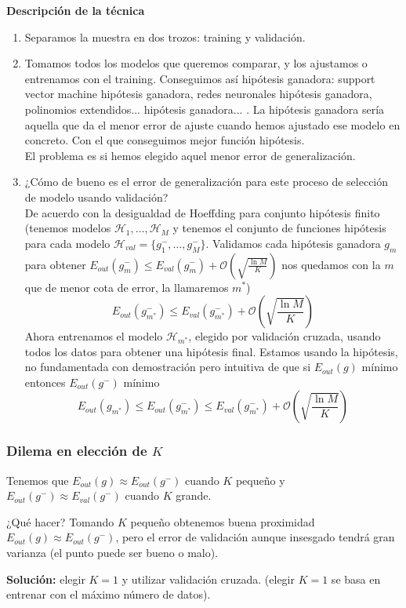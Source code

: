 \documentclass[11pt,a4paper]{article}
\theoremstyle{definition}
\begin{document}
	\textbf{Descripción de la técnica}
	\begin{enumerate}
		\item Separamos la muestra en dos trozos: training y validación.
		\item Tomamos todos los modelos que queremos comparar, y los ajustamos o entrenamos con el training. Conseguimos así hipótesis ganadora: support vector machine hipótesis ganadora, redes neuronales hipótesis ganadora, polinomios extendidos... hipótesis ganadora... . La hipótesis ganadora sería aquella que da el menor error de ajuste cuando hemos ajustado ese modelo en concreto. Con el que conseguimos mejor función hipótesis.\\
		El problema es si hemos elegido aquel menor error de generalización.
		\item ¿Cómo de bueno es el error de generalización para este proceso de selección de modelo usando validación?\\
		De acuerdo con la desigualdad de Hoeffding para conjunto hipótesis finito (tenemos modelos $\mathcal{H}_1,\ldots,\mathcal{H}_M$ y tenemos el conjunto de funciones hipótesis para cada modelo $\mathcal{H}_{val}=\{g_1^-,\ldots, g_M^-\}$. Validamos cada hipótesis ganadora $g_m$ para obtener $E_{out}(g_{m}^-)\leq E_{val}(g_{m}^-)+\mathcal{O}\left(\sqrt{\frac{\ln M}{K}}\right)$ nos quedamos con la $m$ que de menor cota de error, la llamaremos $m^*$)
		$$E_{out}(g_{m^*}^-)\leq E_{val}(g_{m^*}^-)+\mathcal{O}\left(\sqrt{\frac{\ln M}{K}}\right)$$
		Ahora entrenamos el modelo $\mathcal{H}_{m^*}$, elegido por validación cruzada, usando todos los datos para obtener una hipótesis final. Estamos usando la hipótesis, no fundamentada con demostración pero intuitiva de que si $E_{out}(g)$ mínimo entonces $E_{out}(g^-)$ mínimo
		$$E_{out}(g_{m^*})\leq E_{out}(g_{m^*}^-)\leq E_{val}(g_{m^*}^-)+ \mathcal{O}\left(\sqrt{\frac{\ln M}{K}}\right)$$
	\end{enumerate}
	\subsubsection{Dilema en elección de $K$}
	Tenemos que $E_{out}(g)\approx E_{out}(g^-)$ cuando $K$ pequeño y $E_{out}(g^-)\approx E_{val}(g^-)$ cuando $K$ grande.

	¿Qué hacer? Tomando $K$ pequeño obtenemos buena proximidad $E_{out}(g)\approx E_{out}(g^-)$, pero el error de validación aunque insesgado tendrá gran varianza (el punto puede ser bueno o malo).
	
	\textbf{Solución:} elegir $K=1$ y utilizar validación cruzada. (elegir $K=1$ se basa en entrenar con el máximo número de datos).
	
\end{document}

